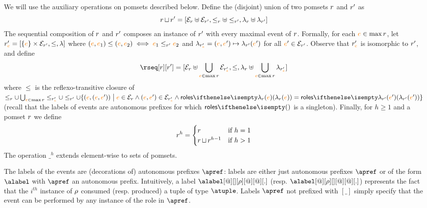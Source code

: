%
We will use the auxiliary operations on pomsets described below.
%
Define the (disjoint) union of two pomsets $r$ and $r'$ as
\[
  r \operatorname{\sqcup} r' =
  [\mathcal{E}_{r} \uplus \mathcal{E}_{r'},
  \leq_{r} \uplus \leq_{r'},
  \lambda_{r} \uplus \lambda_{r'}]
\]
The sequential composition of $r$ and $r'$ composes an
instance of $r'$ with every maximal event of $r$.
%
Formally, for each ${\color{orange}{e}} \in \max r$, let
$r'_{{\color{orange}{e}}} = [\{{\color{orange}{e}}\} \times \mathcal{E}_{r'}, \leq, \lambda]$ where
$({\color{orange}{e}},{\color{orange}{e}}_1) \leq ({\color{orange}{e}},{\color{orange}{e}}_2) \iff {\color{orange}{e}}_1 \leq_{r'} {\color{orange}{e}}_2$ and
$\lambda_{r'_{{\color{orange}{e}}}} = ({\color{orange}{e}},{\color{orange}{e}}') \mapsto \lambda_{r'}({\color{orange}{e}}')$ for
all ${\color{orange}{e}}' \in \mathcal{E}_{r'}$.
%
Observe that $r'_{{\color{orange}{e}}}$ is isomorphic to $r'$, and define
\[
  \rseq[\apom][\apom'] = 
  [\esetof{\apom} \uplus \bigcup_{\ae \in \max \apom}\esetof{\apom'_{\ae}},
  \leq,
  \alfof{\apom} \uplus \bigcup_{\ae \in \max \apom}\alfof{\apom'_{\ae}}]
\]
where $\leq$ is the reflexo-transitive closure of
$\leqof{\apom} \cup \bigcup_{\ae \in \max \apom}\leqof{\apom'_{\ae}}
\cup \leqof{\apom'} \cup \{(\ae,(\ae,\ae')) \sst \ae \in
\esetof{\apom} \land (\ae,\ae') \in \esetof{\apom'_{\ae}} \land
\roles{\alfof{\apom}(\ae)} = \roles{\alfof{\apom'}(\ae')}\}$ (recall
that the labels of events are autonomous prefixes for which
$\roles{}$ is a singleton).
%
%
Finally, for $h \geq 1$ and a pomset $r$ we define
\[
  r^h =
  \begin{cases}
    r & \text{if } h = 1
    \\
    r \operatorname{\sqcup} r^{h-1} & \text{if } h > 1
  \end{cases}
\]
The operation $\_^h$ extends element-wise to sets of pomsets.

The labels of the events are (decorations of) autonomous prefixes
$\apref$: labels are either just autonomous prefixes $\apref$
or of the form $\alabel$ with $\apref$ an autonomous prefix.
%
Intuitively, a label $\alabel[@][][\arole][@][@][.]$
(resp. $\alabel[@][\arole][][@][@][.]$) represents the fact that the
$i^\mathit{th}$ instance of $\rho$ consumed (resp. produced) a tuple
of type $\atuple$.
%
Labels $\apref$ not prefixed with $[\_]$ simply specify that the event
can be performed by any instance of the role in $\apref$.

